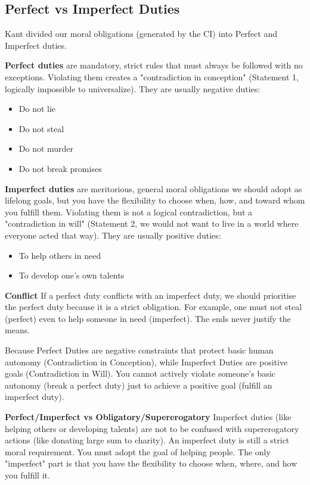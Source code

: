 \documentclass[12pt]{article}
\begin{document}
\subsection{Perfect vs Imperfect Duties}
Kant divided our moral obligations (generated by the CI)
into Perfect and Imperfect duties.

\noindent\textbf{Perfect duties} are mandatory, strict rules that must always be followed with no exceptions.
Violating them creates a "contradiction in conception" (Statement 1, logically impossible to universalize).
They are usually negative duties:
\begin{itemize}
    \item Do not lie
    \item Do not steal
    \item Do not murder
    \item Do not break promises
\end{itemize}

\noindent\textbf{Imperfect duties} are meritorious, general moral obligations we should adopt as lifelong goals,
but you have the flexibility to choose when, how, and toward whom you fulfill them.
Violating them is not a logical contradiction, but a "contradiction in will" (Statement 2, we would not want to live in a world where everyone acted that way).
They are usually positive duties:
\begin{itemize}
    \item To help others in need
    \item To develop one's own talents
\end{itemize}

\noindent\textbf{Conflict} If a perfect duty conflicts with an imperfect duty,
we should prioritise the perfect duty because it is a strict obligation.
For example, one must not steal (perfect) even to help someone in need (imperfect).
The ends never justify the means.

Because Perfect Duties are negative constraints that protect basic human autonomy (Contradiction in Conception), while
Imperfect Duties are positive goals (Contradiction in Will).
You cannot actively violate someone's basic autonomy (break a perfect duty) just to achieve a positive goal (fulfill an imperfect duty).

\vspace{1em}
\noindent\textbf{Perfect/Imperfect vs Obligatory/Supererogatory}
Imperfect duties (like helping others or developing talents) are not to be confused with supererogatory actions (like donating large sum to charity).
An imperfect duty is still a strict moral requirement. You must adopt the goal of helping people. The only "imperfect" part is that you have the flexibility to choose when, where, and how you fulfill it.
\end{document}
